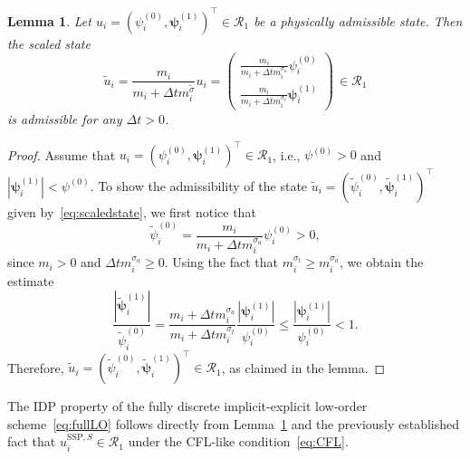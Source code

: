 \documentclass[preprint, 11pt]{elsarticle}
\newcommand{\pz}{\psi^{(0)}}
\newcommand{\po}{\boldsymbol{\psi}^{(1)}}
\newtheorem{lemma}{Lemma}
\begin{document}
\begin{lemma}\label{lem:scaledstate}
    Let $u_i = (\pz_i,\po_i)^\top \in\mathcal{R}_1$ be a physically admissible state. 
    Then the scaled state 
    \begin{equation}\label{eq:scaledstate}
        \tilde u_i = \frac{m_i}{m_i + \Delta t m_i^{\tilde\sigma}} u_i = \left(\begin{array}{c}
             \frac{m_i}{m_i + \Delta t m_i^{\sigma_a}} \pz_i\\
             \frac{m_i}{m_i + \Delta t m_i^{\sigma_t}} \po_i
        \end{array}\right)\, \in\mathcal R_1
    \end{equation}
    is admissible for any $\Delta t >0$.
\end{lemma}
\begin{proof}
    Assume that $u_i = (\pz_i,\po_i)^\top \in\mathcal{R}_1$, i.e., $\pz >0$ and $|\po_i|< \pz$.
    To show the admissibility of the state $\tilde u_i = (\tilde\psi_i^{(0)}, \tilde{\bm\psi}_i^{(1)})^\top$ given by~\eqref{eq:scaledstate}, we first notice that
    \begin{equation*}
        \tilde\psi_i^{(0)} = \frac{m_i}{m_i + \Delta t m_i^{\sigma_a}} \pz_i > 0,
    \end{equation*}
    since $m_i>0$ and $\Delta t m_i^{\sigma_a}\geq 0$.
    Using the fact that $m_i^{\sigma_t} \geq m_i^{\sigma_a}$, we obtain the estimate
    \begin{equation*}
        \frac{\left|\tilde{\bm\psi}_i^{(1)}\right|}{ \tilde\psi_i^{(0)}}%
        = \frac{m_i +\Delta t m_i^{\sigma_a}}{m_i + \Delta t m_i^{\sigma_t}}\frac{|\po_i|}{\pz_i}\leq \frac{|\po_i|}{\pz_i}<1.
    \end{equation*}
    Therefore, $\tilde u_i = (\tilde\psi_i^{(0)}, \tilde{\bm\psi}_i^{(1)})^\top\in\mathcal{R}_1$, as claimed in the lemma.
\end{proof}

The IDP property of the fully discrete implicit-explicit low-order scheme~\eqref{eq:fullLO} follows directly from Lemma~\ref{lem:scaledstate} and the previously established fact that $u_i^{\mathrm{SSP},S}\in\mathcal{R}_1$ under the CFL-like 
condition~\eqref{eq:CFL}.
\end{document}
